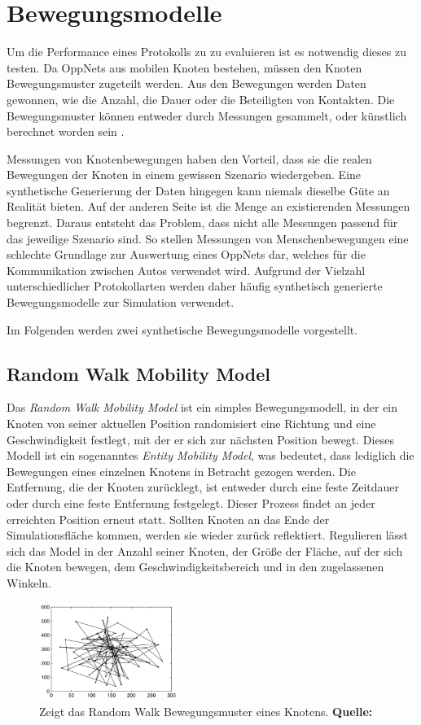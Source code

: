 \documentclass[a4paper, 12pt]{article}
\begin{document}
\section{Bewegungsmodelle}
\label{sec:simulation}
Um die Performance eines Protokolls zu zu evaluieren ist es notwendig dieses zu testen. Da OppNets aus mobilen Knoten bestehen, müssen den Knoten Bewegungsmuster zugeteilt werden. Aus den Bewegungen werden Daten gewonnen, wie die Anzahl, die Dauer oder die Beteiligten von Kontakten.
Die Bewegungsmuster können entweder durch Messungen gesammelt, oder künstlich berechnet worden sein \cite{Mota20145}.

Messungen von Knotenbewegungen haben den Vorteil, dass sie die realen Bewegungen der Knoten in einem gewissen Szenario wiedergeben. Eine synthetische Generierung der Daten hingegen kann niemals dieselbe Güte an Realität bieten.
Auf der anderen Seite ist die Menge an existierenden Messungen begrenzt. Daraus entsteht das Problem, dass nicht alle Messungen passend für das jeweilige Szenario sind. So stellen Messungen von Menschenbewegungen eine schlechte Grundlage zur Auswertung eines OppNets dar, welches für die Kommunikation zwischen Autos verwendet wird.
Aufgrund der Vielzahl unterschiedlicher Protokollarten werden daher häufig synthetisch generierte Bewegungsmodelle zur Simulation verwendet.

Im Folgenden werden zwei synthetische Bewegungsmodelle vorgestellt.

\subsection{Random Walk Mobility Model}
Das \emph{Random Walk Mobility Model} \cite{roy2011random} ist ein simples Bewegungsmodell, in der ein Knoten von seiner aktuellen Position randomisiert eine Richtung und eine Geschwindigkeit festlegt, mit der er sich zur nächsten Position bewegt. Dieses Modell ist ein sogenanntes \emph{Entity Mobility Model}, was bedeutet, dass lediglich die Bewegungen eines einzelnen Knotens in Betracht gezogen werden.
Die Entfernung, die der Knoten zurücklegt, ist entweder durch eine feste Zeitdauer oder durch eine feste Entfernung festgelegt.
Dieser Prozess findet an jeder erreichten Position erneut statt. Sollten Knoten an das Ende der Simulationsfläche kommen, werden sie wieder zurück reflektiert.
Regulieren lässt sich das Model in der Anzahl seiner Knoten, der Größe der Fläche, auf der sich die Knoten bewegen, dem Geschwindigkeitsbereich und in den zugelassenen Winkeln.
\begin{figure}[H]
    \centering
    \includegraphics[width=0.4\textwidth]{img/randomW.pdf}
    \caption{Zeigt das Random Walk Bewegungsmuster eines Knotens. 
    \textbf{Quelle:} \cite{roy2011random}}
    \label{fig:randomwaypoint}
\end{figure}
\end{document}
